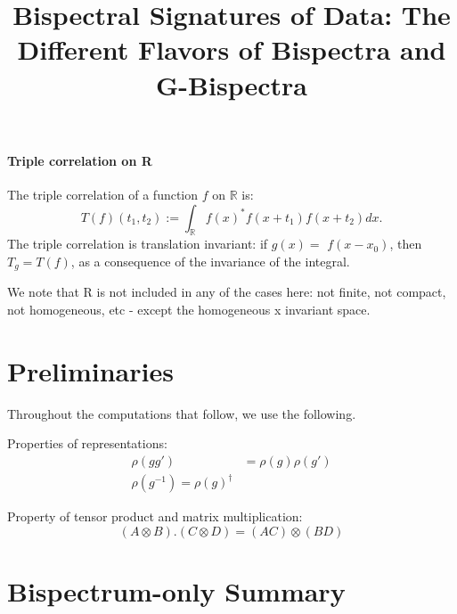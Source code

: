 \documentclass{article}
\title{Bispectral Signatures of Data: The Different Flavors of Bispectra and G-Bispectra}
\author{\vspace{-0.8cm}}
\date{}
\begin{document}
\maketitle
\tableofcontents

\paragraph{Triple correlation on R} The triple correlation of a function $f$ on $\mathbb{R}$ is:
$$
T(f)\left(t_1, t_2\right):=\int_{\mathbb{R}} f(x)^* f\left(x+t_1\right) f\left(x+t_2\right) d x .
$$
The triple correlation is translation invariant: if $g(x)=$ $f\left(x-x_0\right)$, then $T_g=T(f)$, as a consequence of the invariance of the integral.

We note that R is not included in any of the cases here: not finite, not compact, not homogeneous, etc - except the homogeneous x invariant space.

\section{Preliminaries}

Throughout the computations that follow, we use the following.

Properties of representations:
\begin{align*}
    \rho(gg') &= \rho(g) \rho(g')\\
    \rho(g^{-1}) = \rho(g)^\dagger
\end{align*}

Property of tensor product and matrix multiplication:
\begin{equation}
    (A \otimes B) . (C \otimes D) = (AC) \otimes (BD)
\end{equation}

\section{Bispectrum-only Summary}
\end{document}

